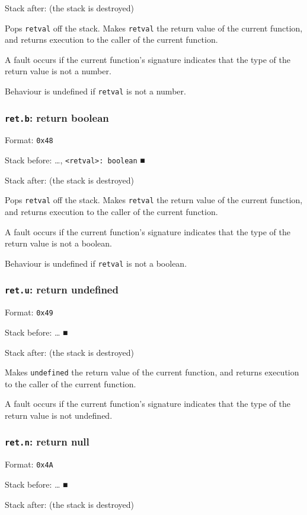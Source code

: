 Stack after: (the stack is destroyed)

Pops \texttt{retval} off the stack. Makes \texttt{retval} the return value of the
current function, and returns execution to the caller of the current
function.

A fault occurs if the current function's signature indicates that the
type of the return value is not a number.

Behaviour is undefined if \texttt{retval} is not a number.

\subsubsection{\texttt{ret.b}: return boolean}
\label{sec:org489d37c}
Format: \texttt{0x48}

Stack before: \ldots{}​, \texttt{<retval>: boolean} ■

Stack after: (the stack is destroyed)

Pops \texttt{retval} off the stack. Makes \texttt{retval} the return value of the
current function, and returns execution to the caller of the current
function.

A fault occurs if the current function's signature indicates that the
type of the return value is not a boolean.

Behaviour is undefined if \texttt{retval} is not a boolean.

\subsubsection{\texttt{ret.u}: return undefined}
\label{sec:org4462eb4}
Format: \texttt{0x49}

Stack before: \ldots{}​ ■

Stack after: (the stack is destroyed)

Makes \texttt{undefined} the return value of the current function, and returns
execution to the caller of the current function.

A fault occurs if the current function's signature indicates that the
type of the return value is not undefined.

\subsubsection{\texttt{ret.n}: return null}
\label{sec:org02d0940}
Format: \texttt{0x4A}

Stack before: \ldots{}​ ■

Stack after: (the stack is destroyed)

